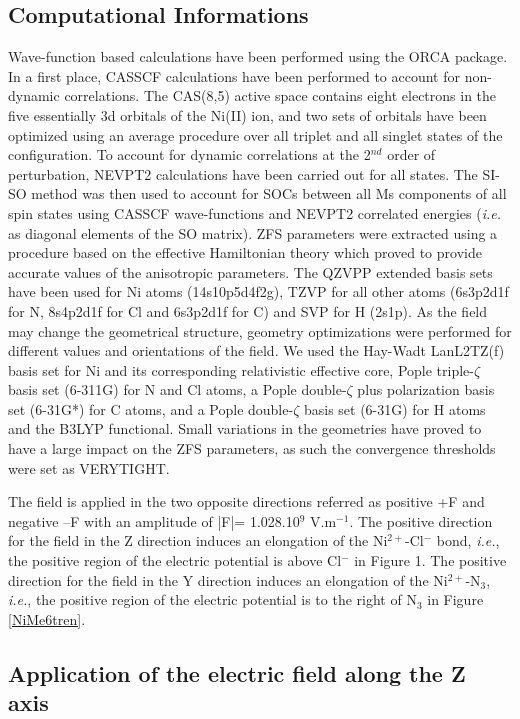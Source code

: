 \documentclass[12pt]{report}
\numberwithin{equation}{section}
\begin{document}
\subsection{Computational Informations}
Wave-function based calculations have been performed using the ORCA package.
In a first place, CASSCF calculations have been performed to account for non-dynamic correlations. 
The CAS(8,5) active space contains eight electrons in the five essentially 3d orbitals of the Ni(II) ion, and two sets of orbitals have been optimized using an average procedure over all triplet and all singlet states of the configuration.
To account for dynamic correlations at the 2$^{nd}$ order of perturbation, NEVPT2 calculations have been carried out for all states. 
The SI-SO method was then used to account for SOCs between all Ms components of all spin states using CASSCF wave-functions and NEVPT2 correlated energies (\textit{i.e.} as diagonal elements of the SO matrix). 
ZFS parameters were extracted using a procedure based on the effective Hamiltonian theory which proved to provide accurate values of the anisotropic parameters. 
The QZVPP extended basis sets have been used for Ni atoms (14s10p5d4f2g), TZVP for all other atoms (6s3p2d1f for N, 8s4p2d1f for Cl and 6s3p2d1f for C) and SVP for H (2s1p). 
As the field may change the geometrical structure, geometry optimizations were performed for different values and orientations of the field. 
We used the Hay-Wadt LanL2TZ(f) basis set for Ni and its corresponding relativistic effective core, Pople triple-$\zeta$ basis set (6-311G) for N and Cl atoms, a Pople double-$\zeta$ plus polarization basis set (6-31G*) for C atoms, and a Pople double-$\zeta$ basis set (6-31G) for H atoms and the B3LYP functional.
Small variations in the geometries have proved to have a large impact on the ZFS parameters, as such the convergence thresholds were set as VERYTIGHT.

The field is applied in the two opposite directions referred as positive +F and negative –F with an amplitude of |F|= 1.028.10$^9$ V.m$^{-1}$.
The positive direction for the field in the Z direction induces an elongation of the Ni$^{2+}$-Cl$^-$ bond, \textit{i.e.}, the positive region of the electric potential is above Cl$^-$ in Figure 1. 
The positive direction for the field in the Y direction induces an elongation of the Ni$^{2+}$-N$_3$, \textit{i.e.}, the positive region of the electric potential is to the right of N$_3$ in Figure \ref{NiMe6tren}.

\subsection{Application of the electric field along the Z axis}
\end{document}
